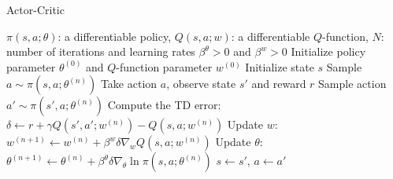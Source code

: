 \begin{algorithm}[htb!]
\caption{Actor-Critic}
\label{Code:ActorCritic}
\begin{algorithmic}
\REQUIRE $\pi(s, a; \theta)$: a differentiable policy, $Q(s, a; w)$: a differentiable $Q$-function, $N$: number of iterations and learning rates $\beta^\theta > 0$ and $\beta^w > 0$
\STATE Initialize policy parameter $\theta^{(0)}$ and $Q$-function parameter $w^{(0)}$
\STATE Initialize state $s$
    \STATE Sample $a \sim \pi(s, a; \theta^{(n)})$
    \STATE Take action $a$, observe state $s'$ and reward $r$
    \STATE Sample action $a' \sim \pi(s', a; \theta^{(n)})$
    \STATE Compute the TD error: $\delta \gets r + \gamma Q(s', a'; w^{(n)}) - Q(s, a; w^{(n)})$
    \STATE Update $w$: $w^{(n+1)} \gets w^{(n)} + \beta^w \delta \nabla_w Q(s, a; w^{(n)})$
    \STATE Update $\theta$: $\theta^{(n+1)} \gets \theta^{(n)} + \beta^\theta \delta \nabla_\theta \ln \pi(s, a; \theta^{(n)})$
    \STATE $s \gets s'$, $a \gets a'$
\ENDFOR
\end{algorithmic}
\end{algorithm}
